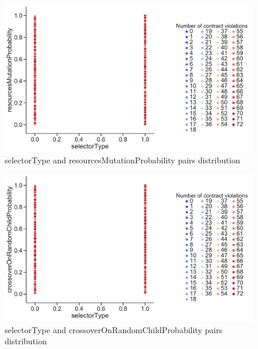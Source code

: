 \clearpage
\begin{figure}
	\centering
	\includegraphics[width=\textwidth]{images/PairsDistr/selectorType_resourcesMutationProbability.pdf}
	\caption[selectorType and resourcesMutationProbability pairs distribution]{selectorType and resourcesMutationProbability pairs distribution}
	\label{fig:selectorType_resourcesMutationProbability_pair}
\end{figure}
\clearpage
\begin{figure}
	\centering
	\includegraphics[width=\textwidth]{images/PairsDistr/selectorType_crossoverOnRandomChildProbability.pdf}
	\caption[selectorType and crossoverOnRandomChildProbability pairs distribution]{selectorType and crossoverOnRandomChildProbability pairs distribution}
	\label{fig:selectorType_crossoverOnRandomChildProbability_pair}
\end{figure}
\clearpage
